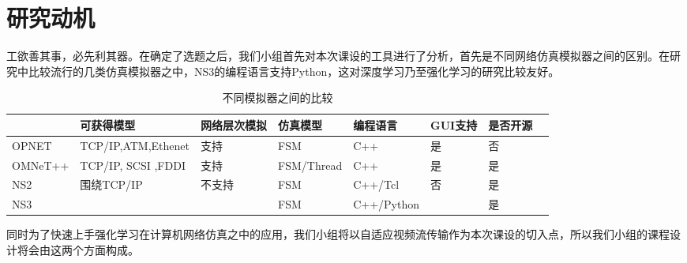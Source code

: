 
\section{研究动机}

工欲善其事，必先利其器。在确定了选题之后，我们小组首先对本次课设的工具进行了分析，首先是不同网络仿真模拟器之间的区别。在研究中比较流行的几类仿真模拟器之中，NS3的编程语言支持Python，这对深度学习乃至强化学习的研究比较友好。

\begin{table}[h]
	\footnotesize
	\begin{center}
	\caption{不同模拟器之间的比较}
	\begin{tabular}{|l|l|l|l|l|l|l|l|} 
		\hline 
	 	& 可获得模型 & 网络层次模拟 & 仿真模型 & 编程语言 & GUI支持 & 是否开源\\ 
		\hline  
		OPNET & TCP/IP,ATM,Ethenet & 支持 & FSM & C++ & 是 & 否 \\ 
		\hline
		OMNeT++ & TCP/IP, SCSI ,FDDI & 支持 & FSM/Thread & C++ & 是 & 是 \\ 
		\hline 
		NS2 & 围绕TCP/IP & 不支持 & FSM & C++/Tcl & 否 & 是 \\
		\hline
		NS3 & & & FSM & C++/Python & & 是\\
		\hline
	\end{tabular}
	\end{center}
\end{table}

同时为了快速上手强化学习在计算机网络仿真之中的应用，我们小组将以自适应视频流传输作为本次课设的切入点，所以我们小组的课程设计将会由这两个方面构成。

